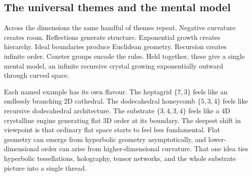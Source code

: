 \subsection{The universal themes and the mental model}

Across the dimensions the same handful of themes repeat. Negative curvature creates room. Reflections generate structure. Exponential growth creates hierarchy. Ideal boundaries produce Euclidean geometry. Recursion creates infinite order. Coxeter groups encode the rules. Held together, these give a single mental model, an infinite recursive crystal growing exponentially outward through curved space.

Each named example has its own flavour. The heptagrid $\{7,3\}$ feels like an endlessly branching 2D cathedral. The dodecahedral honeycomb $\{5,3,4\}$ feels like recursive dodecahedral architecture. The substrate $\{3,4,3,4\}$ feels like a 4D crystalline engine generating flat 3D order at its boundary. The deepest shift in viewpoint is that ordinary flat space starts to feel less fundamental. Flat geometry can emerge from hyperbolic geometry asymptotically, and lower-dimensional order can arise from higher-dimensional curvature. That one idea ties hyperbolic tessellations, holography, tensor networks, and the whole substrate picture into a single thread.
